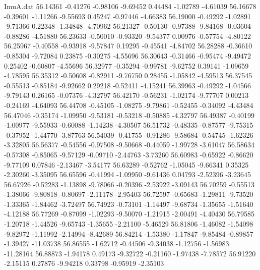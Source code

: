\begin{filecontents}{ImuA.dat}
  56.14361   -0.41276   -0.98106   -9.69452    0.44484   -1.02789   -4.61039
  56.16678   -0.39601   -1.11266   -9.55693    0.45247   -0.97446   -4.66383
  56.19000   -0.49292   -1.02891   -9.71366    0.22348   -1.34848   -4.70962
  56.21327   -0.50130   -0.97388   -9.84168   -0.03604   -0.88286   -4.51880
  56.23633   -0.50010   -0.93320   -9.54377    0.00976   -0.57754   -4.80122
  56.25967   -0.40558   -0.93918   -9.57847    0.19295   -0.45541   -4.84702
  56.28288   -0.36610   -0.85304   -9.72084    0.23875   -0.30275   -4.55696
  56.30643   -0.31466   -0.95474   -9.49472    0.25402   -0.60807   -4.55696
  56.32977   -0.35294   -0.99781   -9.62752    0.39141   -1.09659   -4.78595
  56.35312   -0.50608   -0.82911   -9.76750    0.28455   -1.05842   -4.59513
  56.37545   -0.55513   -0.85184   -9.92662    0.29218   -0.52411   -4.15241
  56.39963   -0.49292   -1.04566   -9.79143    0.26165   -0.07376   -4.32797
  56.42170   -0.56231   -1.02174   -9.77707    0.00213   -0.24169   -4.64093
  56.44708   -0.45105   -1.08275   -9.79861   -0.52455   -0.34092   -4.43484
  56.47046   -0.35174   -1.09950   -9.53181   -0.53218   -0.50885   -4.32797
  56.49387   -0.40199   -1.00977   -9.55933   -0.60088   -1.14238   -4.30507
  56.51732   -0.48335   -0.87577   -9.75315   -0.37952   -1.44770   -3.87763
  56.54039   -0.41755   -0.91286   -9.58684   -0.54745   -1.62326   -3.32805
  56.56377   -0.54556   -0.97508   -9.50668   -0.44059   -1.99728   -3.61047
  56.58634   -0.57308   -0.85065   -9.57129   -0.09710   -2.44763   -3.73260
  56.60983   -0.65922   -0.86620   -9.77109    0.07846   -2.13467   -3.54177
  56.63289   -0.52762   -1.05045   -9.66341    0.35325   -2.30260   -3.35095
  56.65596   -0.41994   -1.09950   -9.61436    0.04793   -2.52396   -3.23645
  56.67926   -0.52283   -1.13898   -9.78066   -0.20396   -2.53922   -3.09143
  56.70259   -0.55513   -1.38066   -9.80818   -0.80697   -2.11178   -2.95403
  56.72597   -0.65683   -1.29811   -9.73520   -1.33365   -1.84462   -3.72497
  56.74923   -0.73101   -1.14497   -9.68734   -1.35655   -1.51640   -4.12188
  56.77269   -0.87099   -1.02293   -9.50070   -1.21915   -2.00491   -4.40430
  56.79585   -1.20718   -1.44526   -9.65743   -1.35655   -2.21100   -5.46529
  56.81806   -1.46082   -1.54098   -9.82972   -1.11992   -2.14994   -8.42689
  56.84214   -1.53380   -1.17847   -9.85484   -0.89857   -1.39427  -11.03738
  56.86555   -1.62712   -0.44506   -9.34038   -1.12756   -1.56983  -11.28164
  56.88873   -1.94178    0.49173   -9.32722   -0.21160   -1.97438   -7.78572
  56.91220   -2.15115    0.27876   -9.94218    0.33798   -0.95919   -2.35103

\end{filecontents}
